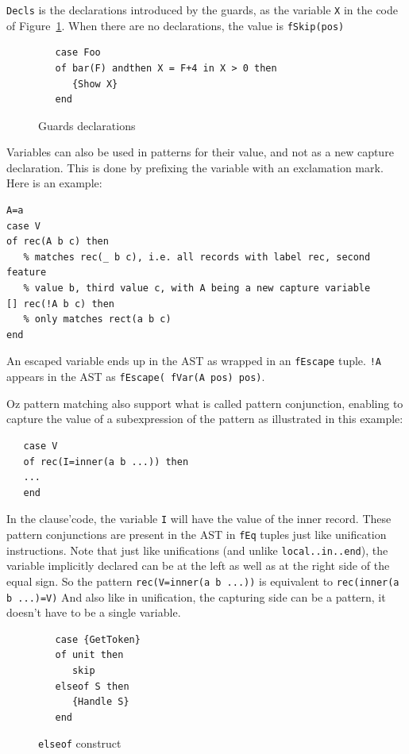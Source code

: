 \documentclass[a4paper]{memoir}
\begin{document}
\lstinline!Decls! is the declarations introduced by the guards, as the variable \lstinline!X! in the code of Figure~\ref{fig:guardsdecls}.
When there are no declarations, the value is \lstinline!fSkip(pos)!

\begin{figure}[h]
\begin{lstlisting}
   case Foo
   of bar(F) andthen X = F+4 in X > 0 then 
      {Show X}
   end
\end{lstlisting}
\caption{Guards declarations}
\label{fig:guardsdecls}
\end{figure}


Variables can also be used in patterns for their value, and not as a new capture
declaration. This is done by prefixing the variable with an exclamation mark.
Here is an example:

\begin{lstlisting}
A=a
case V
of rec(A b c) then
   % matches rec(_ b c), i.e. all records with label rec, second feature 
   % value b, third value c, with A being a new capture variable
[] rec(!A b c) then
   % only matches rect(a b c)
end
\end{lstlisting}

An escaped variable ends up in the AST as wrapped in an \lstinline!fEscape!
tuple. \lstinline$!A$ appears in the AST as \lstinline!fEscape( fVar(A pos) pos)!.

Oz pattern matching also support what is called pattern conjunction, enabling to
capture the value of a subexpression of the pattern as illustrated in this example:
\begin{lstlisting}
   case V 
   of rec(I=inner(a b ...)) then
   ...
   end
\end{lstlisting}

In the clause'code, the variable \lstinline!I! will have the value of the inner record.
These pattern conjunctions are present in the AST in \lstinline!fEq! tuples just 
like unification instructions.
Note that just like unifications (and unlike \lstinline!local..in..end!), the variable implicitly declared can be at the
left as well as at the right side of the equal sign. So the pattern
\lstinline!rec(V=inner(a b ...))! is equivalent to \lstinline!rec(inner(a b ...)=V)!
And also like in unification, the capturing side can be a pattern, it doesn't
have to be a single variable.

\begin{figure}[h]
\begin{lstlisting}
   case {GetToken}
   of unit then
      skip
   elseof S then
      {Handle S}
   end
\end{lstlisting}
\caption{\lstinline!elseof! construct}
\label{fig:input:elseof}
\end{figure}
\end{document}
